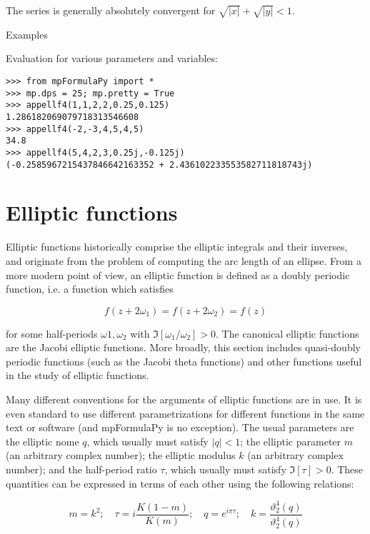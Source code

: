 The series is generally absolutely convergent for $\sqrt{|x|} + \sqrt{|y|}  <1$.

Examples

Evaluation for various parameters and variables:

\begin{lstlisting}
>>> from mpFormulaPy import *
>>> mp.dps = 25; mp.pretty = True
>>> appellf4(1,1,2,2,0.25,0.125)
1.286182069079718313546608
>>> appellf4(-2,-3,4,5,4,5)
34.8
>>> appellf4(5,4,2,3,0.25j,-0.125j)
(-0.2585967215437846642163352 + 2.436102233553582711818743j)
\end{lstlisting}





\newpage
\chapter{Elliptic functions}
Elliptic functions historically comprise the elliptic integrals and their inverses, and originate from the problem of computing the arc length of an ellipse. From a more modern point of view, an elliptic function is defined as a doubly periodic function, i.e. a function which
satisfies

\begin{equation}
f(z+2\omega_1) = f(z+2\omega_2) = f(z)
\end{equation}

for some half-periods $\omega1, \omega_2$ with $\Im[\omega_1/\omega_2]>0$. The canonical elliptic functions are the Jacobi elliptic functions. More broadly, this section includes quasi-doubly periodic functions (such as the Jacobi theta functions) and other functions useful in the study of elliptic functions.

\vpara
Many different conventions for the arguments of elliptic functions are in use. It is even standard to use different parametrizations for different functions in the same text or software (and mpFormulaPy is no exception). The usual parameters are the elliptic nome $q$, which
usually must satisfy $|q|<1$; the elliptic parameter $m$ (an arbitrary complex number); the elliptic modulus $k$ (an arbitrary complex number); and the half-period ratio $\tau$, which usually must satisfy $\Im[\tau]>0$. These quantities can be expressed in terms of each other using the following relations:

\begin{equation}
m=k^2; \quad \tau=i \frac{K(1-m)}{K(m)}; \quad q=e^{i \pi \tau}; \quad k=\frac{\vartheta_2^4(q)}{\vartheta_2^4(q)}
\end{equation}

